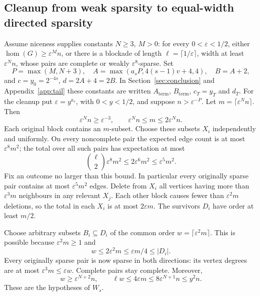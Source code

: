 \documentclass[11pt,a4paper]{article}
\theoremstyle{definition}
\theoremstyle{remark}
\numberwithin{equation}{section}
\begin{document}
\subsection{Cleanup from weak sparsity to equal-width directed sparsity}
Assume niceness supplies constants \(N\ge3\), \(M>0\): for every \(0<\varepsilon<1/2\), either \(\hom(G)\ge\varepsilon^M n\), or there is a blockade of length \(\ell=\lceil1/\varepsilon\rceil\), width at least \(\varepsilon^N n\), whose pairs are complete or weakly \(\varepsilon^8\)-sparse. Set
\begin{equation}\label{eq:term-constants}
 P=\max(M,N+3),\quad
 A=\max(a_sP,4(s-1)v+4,4),\quad B=A+2,
\end{equation}
and \(c=y_0=2^{-4s}\), \(d=2A+4=2B\). In Section~\ref{sec:conclusion} and Appendix~\ref{app:tail} these constants are written \(A_{\mathrm{term}}\), \(B_{\mathrm{term}}\), \(c_{T}=y_{T}\) and \(d_{T}\). For the cleanup put \(\varepsilon=y^{a_s}\), with \(0<y<1/2\), and suppose \(n>\varepsilon^{-P}\). Let \(m=\lceil\varepsilon^Nn\rceil\). Then
\[
 \varepsilon^Nn\ge\varepsilon^{-3},\qquad
 \varepsilon^Nn\le m\le2\varepsilon^Nn.
\]
Each original block contains an \(m\)-subset. Choose these subsets \(X_i\) independently and uniformly. On every noncomplete pair the expected edge count is at most \(\varepsilon^8m^2\); the total over all such pairs has expectation at most
\[
 \binom\ell2\varepsilon^8m^2\le2\varepsilon^6m^2\le\varepsilon^5m^2.
\]
Fix an outcome no larger than this bound. In particular every originally sparse pair contains at most \(\varepsilon^5m^2\) edges. Delete from \(X_i\) all vertices having more than \(\varepsilon^3m\) neighbours in any relevant \(X_j\). Each other block causes fewer than \(\varepsilon^2m\) deletions, so the total in each \(X_i\) is at most \(2\varepsilon m\). The survivors \(D_i\) have order at least \(m/2\).

Choose arbitrary subsets \(B_i\subseteq D_i\) of the common order
\(w=\lceil\varepsilon^2m\rceil\). This is possible because \(\varepsilon^2m\ge1\) and
\[
 w\le2\varepsilon^2m\le\varepsilon m/4\le|D_i|.
\]
Every originally sparse pair is now sparse in both directions: its vertex degrees are at most \(\varepsilon^3m\le\varepsilon w\). Complete pairs stay complete. Moreover,
\[
 w\ge\varepsilon^{N+2}n,\qquad
 \ell w\le4\varepsilon m\le8\varepsilon^{N+1}n\le y^2n.
\]
These are the hypotheses of \(W_s\).
\end{document}
